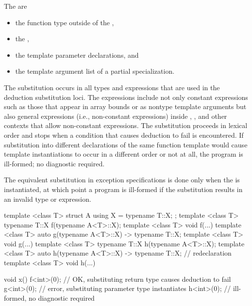 \pnum
{}%
The  are
\begin{itemize}
\item the function type outside of the ,
\item the ,
\item the template parameter declarations, and
\item the template argument list of a partial specialization.
\end{itemize}
The substitution occurs in all types and expressions that are used
in the deduction substitution loci.
The expressions include not only
constant expressions such as those that appear in array bounds or as nontype
template arguments but also general expressions (i.e., non-constant expressions)
inside , , and other contexts that allow non-constant
expressions. The substitution proceeds in lexical order and stops when
a condition that causes deduction to fail is encountered.
If substitution into different declarations of the same function template would
cause template instantiations to occur in a different order or not at all,
the program is ill-formed; no diagnostic required.
\begin{note}
The equivalent substitution in exception specifications is
done only when the  is instantiated,
at which point a program is ill-formed
if the substitution results in an invalid type or expression.
\end{note}
\begin{example}
\begin{codeblock}
template <class T> struct A { using X = typename T::X; };
template <class T> typename T::X f(typename A<T>::X);
template <class T> void f(...) { }
template <class T> auto g(typename A<T>::X) -> typename T::X;
template <class T> void g(...) { }
template <class T> typename T::X h(typename A<T>::X);
template <class T> auto h(typename A<T>::X) -> typename T::X;   // redeclaration
template <class T> void h(...) { }

void x() {
  f<int>(0);        // OK, substituting return type causes deduction to fail
  g<int>(0);        // error, substituting parameter type instantiates 
  h<int>(0);        // ill-formed, no diagnostic required
}
\end{codeblock}
\end{example}

